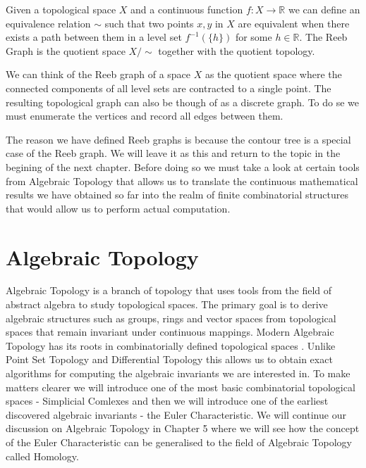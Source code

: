 \begin{defn}
Given a topological space $X$ and a continuous function $f: X \to \mathbb{R}$ we can define an equivalence relation $\sim$ such that two points $x, y$ in $X$ are equivalent when there exists a path between them in a level set $f^{-1}(\{h\})$ for some $h \in \mathbb{R}$. The Reeb Graph is the quotient space $X \big/ \sim$ together with the quotient topology.
\end{defn}

We can think of the Reeb graph of a space $X$ as the quotient space where the connected components of all level sets are contracted to a single point. The resulting topological graph can also be though of as a discrete graph. To do se we must enumerate the vertices and record all edges between them.

The reason we have defined Reeb graphs is because the contour tree is a special case of the Reeb graph. We will leave it as this and return to the topic in the begining of the next chapter. Before doing so we must take a look at certain tools from Algebraic Topology that allows us to translate the continuous mathematical results we have obtained so far into the realm of finite combinatorial structures that would allow us to perform actual computation.

\section{Algebraic Topology}

Algebraic Topology is a branch of topology that uses tools from the field of abstract algebra to study topological spaces. The primary goal is to derive algebraic structures such as groups, rings and vector spaces from topological spaces that remain invariant under continuous mappings. Modern Algebraic Topology has its roots in combinatorially defined topological spaces \cite{combinatorial-algebraic-topology}. Unlike Point Set Topology and Differential Topology this allows us to obtain exact algorithms for computing the algebraic invariants we are interested in. To make matters clearer we will introduce one of the most basic combinatorial topological spaces - Simplicial Comlexes and then we will introduce one of the earliest discovered algebraic invariants - the Euler Characteristic. We will continue our discussion on Algebraic Topology in Chapter 5 where we will see how the concept of the Euler Characteristic can be generalised to the field of Algebraic Topology called Homology.

